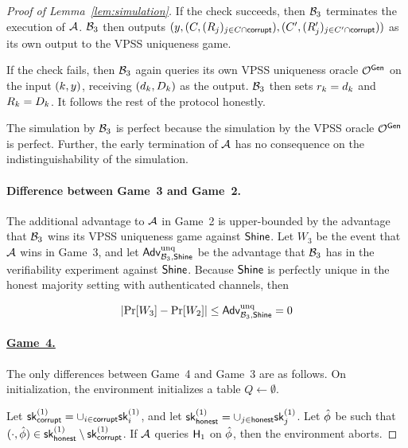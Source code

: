 \begin{proof}[Proof of Lemma~\ref{lem:simulation}]
  If the check succeeds,
  then $\mathcal{B}_3$ terminates the execution of $\mathcal{A}$.
  $\mathcal{B}_3$ then outputs
  $(y, (C, \allowbreak (R_j)_{j \in C \cap \mathsf{corrupt}}), \allowbreak (C', \allowbreak (R_j')_{j \in C' \cap \mathsf{corrupt}}))$
  as its own output to the VPSS uniqueness game.

  If the check fails,
  then $\mathcal{B}_3$ again queries its own VPSS uniqueness oracle $\mathcal{O}^{\mathsf{Gen}}$ on the input $(k, y)$,
  receiving $(d_k, D_k)$ as the output.
  $\mathcal{B}_3$ then sets $r_k = d_k$  and $R_k = D_k$.
  It follows the rest of the protocol honestly.

  The simulation by $\mathcal{B}_3$ is perfect because the simulation by the VPSS oracle $\mathcal{O}^{\mathsf{Gen}}$ is perfect.
  Further, the early termination of $\mathcal{A}$ has no consequence on the indistinguishability of the simulation.


  \paragraph{Difference between Game~3 and Game~2.}
  The additional advantage to $\mathcal{A}$ in Game~2 is upper-bounded by the advantage that $\mathcal{B}_3$ wins its VPSS uniqueness game against $\mathsf{Shine}$.
  Let $W_3$ be the event that $\mathcal{A}$ wins in Game~3,
  and let $\textsf{\upshape Adv}^{\textrm{\upshape unq}}_{\mathcal{B}_3, \mathsf{Shine}}$ be the advantage that $\mathcal{B}_3$ has in the verifiability experiment against $\mathsf{Shine}$.
  Because $\mathsf{Shine}$ is perfectly unique in the honest majority setting with authenticated channels,
  then

  \begin{equation} \label{eq:game3}
    \lvert \Pr[W_3] - \Pr[W_2] \rvert \leq  \textsf{\upshape Adv}^{\textrm{\upshape unq}}_{\mathcal{B}_3, \mathsf{Shine}} = 0
  \end{equation}



  \paragraph{\underline{Game~4.}}
  The only differences between Game~4 and Game~3 are as follows.
  On initialization, the environment initializes a table $Q \gets \emptyset$.

  Let $\mathsf{sk}^{(1)}_{\mathsf{corrupt}} = \cup_{i \in \mathsf{corrupt}} \mathsf{sk}^{(1)}_i$,
  and let $\mathsf{sk}^{(1)}_{\mathsf{honest}} = \cup_{j \in \mathsf{honest}} \mathsf{sk}^{(1)}_j$.
  Let $\hat{\phi}$ be such that $(\cdot, \hat{\phi}) \in
  \mathsf{sk}^{(1)}_{\mathsf{honest}} \setminus \mathsf{sk}^{(1)}_{\mathsf{corrupt}}$.
  If $\mathcal{A}$ queries $\mathsf{H}_1$ on $\hat{\phi}$,
  then the environment aborts.



\end{proof}

